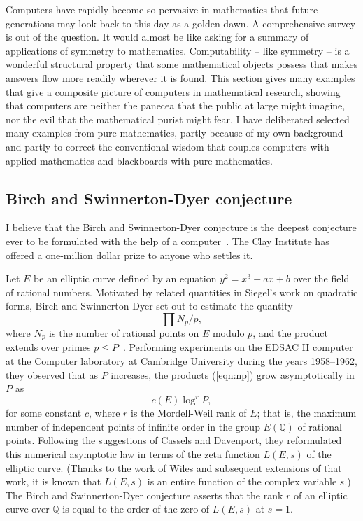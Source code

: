 \documentclass{llncs}
\newcommand{\ring}[1]{\mathbb{#1}}
\begin{document}
\bigskip

Computers have rapidly become so pervasive in mathematics that future
generations may look back to this day as a golden dawn.  A
comprehensive survey is out of the question.  It would almost be like
asking for a summary of applications of symmetry to mathematics.
Computability -- like symmetry -- is a wonderful structural property
that some mathematical objects possess that makes answers flow more
readily wherever it is found.  This section gives many examples that
give a composite picture of computers in mathematical research,
showing that computers are neither the panecea that the public at
large might imagine, nor the evil that the mathematical purist might
fear.  I have deliberated selected many examples from pure
mathematics, partly because of my own background and partly to correct
the conventional wisdom that couples computers with applied
mathematics and blackboards with pure mathematics.


\subsection{Birch and Swinnerton-Dyer conjecture}

I believe that the Birch and Swinnerton-Dyer conjecture is the deepest
conjecture ever to be formulated with the help of a computer~\cite{BSD}.  The
Clay Institute has offered a one-million dollar prize to anyone who
settles it.

Let $E$  be an elliptic curve defined by
an equation $y^2 = x^3 + a x + b$ 
over the field of rational
numbers.  Motivated by related quantities in Siegel's work on quadratic forms, Birch and Swinnerton-Dyer set out to estimate the quantity
\begin{equation}\label{eqn:np}
\prod {N_p/p},
\end{equation}
where $N_p$ is the number of rational points on $E$ modulo $p$, and
the product extends over primes $p\le P$~\cite{Bir}.  Performing
experiments on the EDSAC II computer at the Computer laboratory at Cambridge University during the years 1958--1962, they observed that as $P$ increases, the products (\ref{eqn:np})
grow asymptotically in $P$ as 
\[
c(E) \log^r P,
\]
for some constant $c$, where $r$ is the Mordell-Weil rank of $E$; that
is, the maximum number of independent points of infinite order in the
group $E(\ring{Q})$ of rational points.  Following the suggestions of
Cassels and Davenport, they reformulated this numerical asymptotic law in
terms of the zeta function $L(E,s)$ of the elliptic curve.  (Thanks to the work of Wiles
and subsequent extensions of that
work, it is known that $L(E,s)$ is an entire function of the complex
variable $s$.)  The Birch and Swinnerton-Dyer conjecture asserts that
the rank $r$ of an elliptic curve over $\ring{Q}$ is equal to the
order of the zero of $L(E,s)$ at $s=1$.
\end{document}
